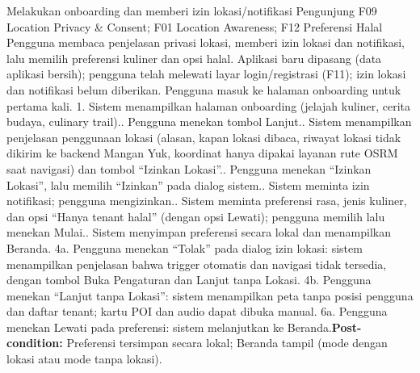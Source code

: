 {Melakukan onboarding dan memberi izin lokasi/notifikasi}
{Pengunjung}
{F09 Location Privacy \& Consent; F01 Location Awareness; F12 Preferensi Halal}
{Pengguna membaca penjelasan privasi lokasi, memberi izin lokasi dan notifikasi, lalu memilih preferensi kuliner dan opsi halal.}
{Aplikasi baru dipasang (data aplikasi bersih); pengguna telah melewati layar login/registrasi (F11); izin lokasi dan notifikasi belum diberikan.}
{Pengguna masuk ke halaman onboarding untuk pertama kali.}
{1. Sistem menampilkan halaman onboarding (jelajah kuliner, cerita budaya, culinary trail).. Pengguna menekan tombol Lanjut.. Sistem menampilkan penjelasan penggunaan lokasi (alasan, kapan lokasi dibaca, riwayat lokasi tidak dikirim ke backend Mangan Yuk, koordinat hanya dipakai layanan rute OSRM saat navigasi) dan tombol ``Izinkan Lokasi''.. Pengguna menekan ``Izinkan Lokasi'', lalu memilih ``Izinkan'' pada dialog sistem.. Sistem meminta izin notifikasi; pengguna mengizinkan.. Sistem meminta preferensi rasa, jenis kuliner, dan opsi ``Hanya tenant halal'' (dengan opsi Lewati); pengguna memilih lalu menekan Mulai.. Sistem menyimpan preferensi secara lokal dan menampilkan Beranda.}
{4a. Pengguna menekan ``Tolak'' pada dialog izin lokasi: sistem menampilkan penjelasan bahwa trigger otomatis dan navigasi tidak tersedia, dengan tombol Buka Pengaturan dan Lanjut tanpa Lokasi.\newline
4b. Pengguna menekan ``Lanjut tanpa Lokasi'': sistem menampilkan peta tanpa posisi pengguna dan daftar tenant; kartu POI dan audio dapat dibuka manual.\newline
6a. Pengguna menekan Lewati pada preferensi: sistem melanjutkan ke Beranda.\newline\textbf{Post-condition:} Preferensi tersimpan secara lokal; Beranda tampil (mode dengan lokasi atau mode tanpa lokasi).}

